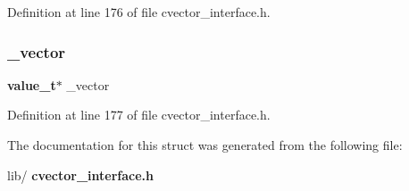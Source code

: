 Definition at line 176 of file cvector\+\_\+interface.\+h.

\mbox{\label{structcvector_ae60afc8a80c3a6c945520216265ebbe0}} 
\subsubsection{\+\_\+vector}
{\footnotesize\ttfamily \textbf{ value\+\_\+t}$\ast$ \+\_\+vector}



Definition at line 177 of file cvector\+\_\+interface.\+h.



The documentation for this struct was generated from the following file\+:\begin{DoxyCompactItemize}
\item 
lib/\textbf{ cvector\+\_\+interface.\+h}\end{DoxyCompactItemize}
